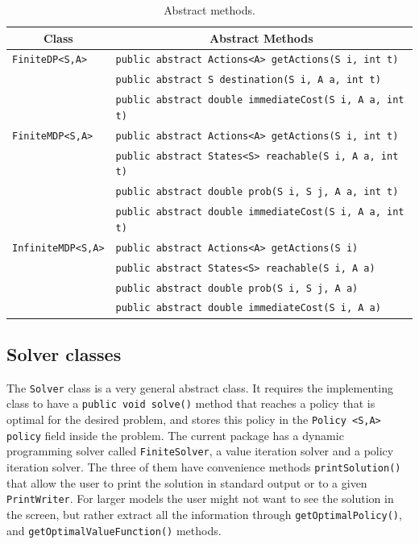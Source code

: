 \documentclass[11pt]{article}
\newcommand {\lil}{\lstinline}
\begin{document}
\begin{table}[ht]
  \centering
    \begin{tabular}{|l|l|}
      \hline
      \multicolumn{1}{|c|}{Class} & \multicolumn{1}{|c|}{Abstract Methods}\\
      \hline
      \lstinline!FiniteDP<S,A>! & \lstinline!public abstract Actions<A> getActions(S i, int t)! \\
      &\lstinline!public abstract S destination(S i, A a, int t)!\\

      &\lstinline!public abstract double immediateCost(S i, A a, int t)!\\
      \hline
      \lstinline!FiniteMDP<S,A>! & \lstinline!public abstract Actions<A> getActions(S i, int t)! \\
      &\lstinline!public abstract States<S> reachable(S i, A a, int t)!\\
      &\lstinline!public abstract double prob(S i, S j, A a, int t)!\\
      &\lstinline!public abstract double immediateCost(S i, A a, int t)!\\
      \hline
      \lstinline!InfiniteMDP<S,A>! & \lstinline!public abstract Actions<A> getActions(S i)! \\
      &\lstinline!public abstract States<S> reachable(S i, A a)!\\
      &\lstinline!public abstract double prob(S i, S j, A a)!\\
      &\lstinline!public abstract double immediateCost(S i, A a)!\\
      \hline
    \end{tabular}
  \caption{Abstract methods.}
  \label{tab:AbstractMethods}
\end{table}

\subsection{Solver classes}

The \lstinline!Solver! class is a very general abstract class. It requires the implementing class to have a \lstinline!public void solve()! method that reaches a policy that is optimal for the desired problem, and stores this policy in the \lstinline!Policy <S,A> policy! field inside the problem. The current package has a dynamic programming solver called \lstinline!FiniteSolver!, a value iteration solver and a policy iteration solver. The three of them have convenience methods \lil!printSolution()! that allow the user to print the solution in standard output or to a given \lil!PrintWriter!. For larger models the user might not want to see the solution in the screen, but rather extract all the information through \lil!getOptimalPolicy()!, and \lil!getOptimalValueFunction()! methods.
\end{document}
